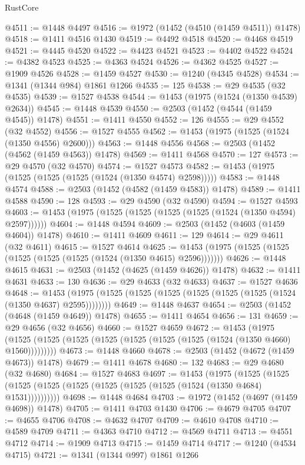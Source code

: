 \begin{lexlean}{RustCore}
\begin{coremodule}
{\begin{coremodule}
{{{{{{{{{{{{{{{{{{{{{{{{{{{{{{{{{{{{{{{{{{{{{@4511 := @1448 @4497
@4516 := @1972 (@1452 (@4510 (@1459 @4511)) @1478)
@4518 := @1411 @4516 @1430
@4519 := @4492 @4518
@4520 := @4468 @4519
@4521 := @4445 @4520
@4522 := @4423 @4521
@4523 := @4402 @4522
@4524 := @4382 @4523
@4525 := @4363 @4524
@4526 := @4362 @4525
@4527 := @1909 @4526
@4528 := @1459 @4527
@4530 := @1240 (@4345 @4528)
@4534 := @1341 (@1344 @984) @1861 @1266
@4535 := 125
@4538 := @29 @4535 (@32 @4535)
@4539 := @1527 @4538
@4544 := @1453 (@1975 (@1524 (@1350 @4539) @2634))
@4545 := @1448 @4539
@4550 := @2503 (@1452 (@4544 (@1459 @4545)) @1478)
@4551 := @1411 @4550
@4552 := 126
@4555 := @29 @4552 (@32 @4552)
@4556 := @1527 @4555
@4562 := @1453 (@1975 (@1525 (@1524 (@1350 @4556) @2600)))
@4563 := @1448 @4556
@4568 := @2503 (@1452 (@4562 (@1459 @4563)) @1478)
@4569 := @1411 @4568
@4570 := 127
@4573 := @29 @4570 (@32 @4570)
@4574 := @1527 @4573
@4582 := @1453 (@1975 (@1525 (@1525 (@1525 (@1524 (@1350 @4574) @2598)))))
@4583 := @1448 @4574
@4588 := @2503 (@1452 (@4582 (@1459 @4583)) @1478)
@4589 := @1411 @4588
@4590 := 128
@4593 := @29 @4590 (@32 @4590)
@4594 := @1527 @4593
@4603 := @1453 (@1975 (@1525 (@1525 (@1525 (@1525 (@1524 (@1350 @4594) @2597))))))
@4604 := @1448 @4594
@4609 := @2503 (@1452 (@4603 (@1459 @4604)) @1478)
@4610 := @1411 @4609
@4611 := 129
@4614 := @29 @4611 (@32 @4611)
@4615 := @1527 @4614
@4625 := @1453 (@1975 (@1525 (@1525 (@1525 (@1525 (@1525 (@1524 (@1350 @4615) @2596)))))))
@4626 := @1448 @4615
@4631 := @2503 (@1452 (@4625 (@1459 @4626)) @1478)
@4632 := @1411 @4631
@4633 := 130
@4636 := @29 @4633 (@32 @4633)
@4637 := @1527 @4636
@4648 := @1453 (@1975 (@1525 (@1525 (@1525 (@1525 (@1525 (@1525 (@1524 (@1350 @4637) @2595))))))))
@4649 := @1448 @4637
@4654 := @2503 (@1452 (@4648 (@1459 @4649)) @1478)
@4655 := @1411 @4654
@4656 := 131
@4659 := @29 @4656 (@32 @4656)
@4660 := @1527 @4659
@4672 := @1453
    (@1975 (@1525 (@1525 (@1525 (@1525 (@1525 (@1525 (@1525 (@1524 (@1350 @4660) @1560)))))))))
@4673 := @1448 @4660
@4678 := @2503 (@1452 (@4672 (@1459 @4673)) @1478)
@4679 := @1411 @4678
@4680 := 132
@4683 := @29 @4680 (@32 @4680)
@4684 := @1527 @4683
@4697 := @1453
    (@1975
      (@1525 (@1525 (@1525 (@1525 (@1525 (@1525 (@1525 (@1525 (@1524 (@1350 @4684) @1531))))))))))
@4698 := @1448 @4684
@4703 := @1972 (@1452 (@4697 (@1459 @4698)) @1478)
@4705 := @1411 @4703 @1430
@4706 := @4679 @4705
@4707 := @4655 @4706
@4708 := @4632 @4707
@4709 := @4610 @4708
@4710 := @4589 @4709
@4711 := @4363 @4710
@4712 := @4569 @4711
@4713 := @4551 @4712
@4714 := @1909 @4713
@4715 := @1459 @4714
@4717 := @1240 (@4534 @4715)
@4721 := @1341 (@1344 @997) @1861 @1266
}}}}}}}}}}}}}}}}}}}}}}}}}}}}}}}}}}}}}}}}}}}}}
\end{coremodule}}
\end{coremodule}
\end{lexlean}
